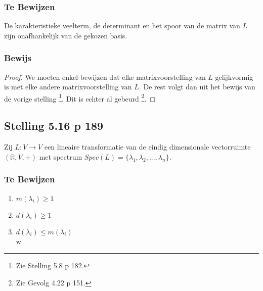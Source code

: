 \documentclass[lineaire_algebra_oplossingen.tex]{subfiles}
\begin{document}
\subsubsection*{Te Bewijzen}
De karakteristieke veelterm, de determinant en het spoor van de matrix van $L$ zijn onafhankelijk van de gekozen basis.

\subsubsection*{Bewijs}
\begin{proof}
We moeten enkel bewijzen dat elke matrixvoorstelling van $L$ gelijkvormig is met elke andere matrixvoorstelling van $L$. De rest volgt dan uit het bewijs van de vorige stelling \footnote{Zie Stelling 5.8 p 182.}. Dit is echter al gebeurd \footnote{Zie Gevolg 4.22 p 151.}.
\end{proof}



\subsection{Stelling 5.16 p 189}
Zij $L:V\rightarrow V$ een lineaire transformatie van de eindig dimensionale vectorruimte $(\mathbb{R},V,+)$ met spectrum $Spec(L) = \{\lambda_1,\lambda_2,...,\lambda_n\}$.

\subsubsection*{Te Bewijzen}
\begin{enumerate}
\item $m(\lambda_i) \ge 1$\\
\item $d(\lambda_i) \ge 1$\\
\item $d(\lambda_i) \le m(\lambda_i)$\\w
\end{enumerate}
\end{document}
